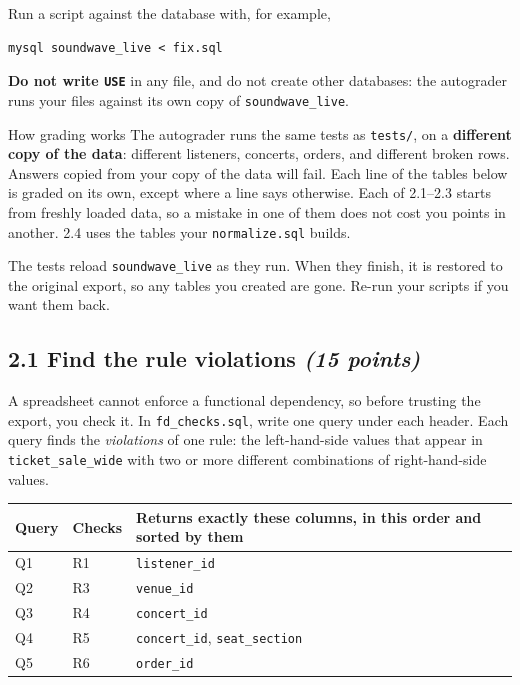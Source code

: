 \documentclass[11pt]{article}
\newcommand{\code}[1]{\texttt{#1}}
\newcommand{\pts}[1]{\hfill\textit{(#1 points)}}
\begin{document}
Run a script against the database with, for example,
\begin{lstlisting}
mysql soundwave_live < fix.sql
\end{lstlisting}
\textbf{Do not write \code{USE}} in any file, and do not create other
databases: the autograder runs your files against its own copy of
\code{soundwave\_live}.

\begin{notebox}{How grading works}
The autograder runs the same tests as \code{tests/}, on a \textbf{different
copy of the data}: different listeners, concerts, orders, and different broken
rows. Answers copied from your copy of the data will fail. Each line of the
tables below is graded on its own, except where a line says otherwise. Each of
2.1--2.3 starts from freshly loaded data, so a mistake in one of them does not
cost you points in another. 2.4 uses the tables your \code{normalize.sql}
builds.

The tests reload \code{soundwave\_live} as they run. When they finish, it is
restored to the original export, so any tables you created are gone. Re-run
your scripts if you want them back.
\end{notebox}

\subsection*{2.1 Find the rule violations \pts{15}}

A spreadsheet cannot enforce a functional dependency, so before trusting the
export, you check it. In \code{fd\_checks.sql}, write one query under each
header. Each query finds the \emph{violations} of one rule: the left-hand-side
values that appear in \code{ticket\_sale\_wide} with two or more different
combinations of right-hand-side values.

\begin{center}
\small
\begin{tabular}{@{}lll@{}}
\toprule
\textbf{Query} & \textbf{Checks} & \textbf{Returns exactly these columns, in this order and sorted by them}\\
\midrule
Q1 & R1 & \code{listener\_id}\\
Q2 & R3 & \code{venue\_id}\\
Q3 & R4 & \code{concert\_id}\\
Q4 & R5 & \code{concert\_id}, \code{seat\_section}\\
Q5 & R6 & \code{order\_id}\\
\bottomrule
\end{tabular}
\end{center}
\end{document}
